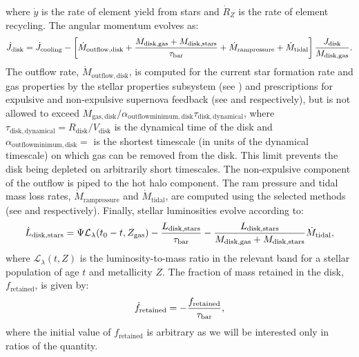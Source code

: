 where $\dot{y}$ is the rate of element yield from stars and $\dot{R}_Z$ is the rate of element recycling. The angular momentum evolves as:
\begin{equation}
 \dot{J}_\mathrm{disk} = \dot{J}_\mathrm{cooling} - \left[ \dot{M}_\mathrm{outflow, disk} + {M_\mathrm{disk, gas}  + M_\mathrm{disk, stars} \over \tau_\mathrm{bar}} + \dot{M}_\mathrm{ram pressure} + \dot{M}_\mathrm{tidal}\right] {J_\mathrm{disk} \over M_\mathrm{disk, gas}}.
\end{equation}
The outflow rate, $\dot{M}_\mathrm{outflow, disk}$, is computed for the current star formation rate and gas properties by the stellar properties subsystem (see ) and prescriptions for expulsive and non-expulsive supernova feedback (see  and  respectively), but is not allowed to exceed $M_\mathrm{gas, disk}/ \alpha_\mathrm{outflow minimum, disk} \tau_\mathrm{disk, dynamical}$, where $\tau_\mathrm{disk, dynamical}=R_\mathrm{disk}/V_\mathrm{disk}$ is the dynamical time of the disk and $\alpha_\mathrm{outflow minimum, disk}=${\normalfont \ttfamily [diskOutflowTimescaleMinimum]} is the shortest timescale (in units of the dynamical timescale) on which gas can be removed from the disk. This limit prevents the disk being depleted on arbitrarily short timescales. The non-expulsive \gls{component} of the outflow is piped to the hot halo component.  The ram pressure and tidal mass loss rates, $\dot{M}_\mathrm{ram pressure}$ and $\dot{M}_\mathrm{tidal}$, are computed using the selected methods (see  and  respectively).
Finally, stellar luminosities evolve according to:
\begin{equation}
\dot{L}_\mathrm{disk, stars} = \Psi \mathcal{L}_\lambda(t_0-t,Z_\mathrm{gas})  - {L_\mathrm{disk, stars} \over \tau_\mathrm{bar}} - {L_\mathrm{disk, stars} \over M_\mathrm{disk, gas} + M_\mathrm{disk, stars}} \dot{M}_\mathrm{tidal},
\end{equation}
where $\mathcal{L}_\lambda(t,Z)$ is the luminosity-to-mass ratio in the relevant band for a stellar population of age $t$ and metallicity $Z$. The fraction of mass retained in the disk, $f_\mathrm{retained}$, is given by:
\begin{equation}
  \dot{f}_\mathrm{retained} = - {f_\mathrm{retained} \over \tau_\mathrm{bar}},
\end{equation}
where the initial value of $f_\mathrm{retained}$ is arbitrary as we will be interested only in ratios of the quantity.

